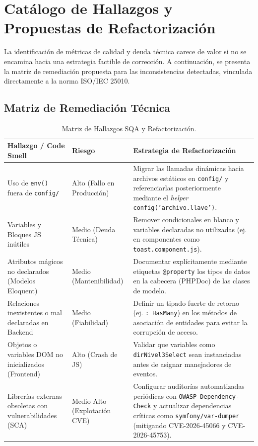 \section{Catálogo de Hallazgos y Propuestas de Refactorización}

La identificación de métricas de calidad y deuda técnica carece de valor si no se encamina hacia una estrategia factible de corrección. A continuación, se presenta la matriz de remediación propuesta para las inconsistencias detectadas, vinculada directamente a la norma ISO/IEC 25010.

\subsection{Matriz de Remediación Técnica}

\begin{table}[h!]
\centering
\small
\begin{tabular}{|p{4.5cm}|p{2cm}|p{8.2cm}|}
\hline
\textbf{Hallazgo / Code Smell} & \textbf{Riesgo} & \textbf{Estrategia de Refactorización} \\ \hline
Uso de \texttt{env()} fuera de \texttt{config/} & Alto (Fallo en Producción) & Migrar las llamadas dinámicas hacia archivos estáticos en \texttt{config/} y referenciarlas posteriormente mediante el \textit{helper} \texttt{config('archivo.llave')}. \\ \hline
Variables y Bloques JS inútiles & Medio (Deuda Técnica) & Remover condicionales en blanco y variables declaradas no utilizadas (ej. en componentes como \texttt{toast.component.js}). \\ \hline
Atributos mágicos no declarados (Modelos Eloquent) & Medio (Mantenibilidad) & Documentar explícitamente mediante etiquetas \texttt{@property} los tipos de datos en la cabecera (PHPDoc) de las clases de modelo. \\ \hline
Relaciones inexistentes o mal declaradas en Backend & Medio (Fiabilidad) & Definir un tipado fuerte de retorno (ej. \texttt{: HasMany}) en los métodos de asociación de entidades para evitar la corrupción de acceso. \\ \hline
Objetos o variables DOM no inicializados (Frontend) & Alto (Crash de JS) & Validar que variables como \texttt{dirNivel3Select} sean instanciadas antes de asignar manejadores de eventos. \\ \hline
Librerías externas obsoletas con vulnerabilidades (SCA) & Medio-Alto (Explotación CVE) & Configurar auditorías automatizadas periódicas con \texttt{OWASP Dependency-Check} y actualizar dependencias críticas como \texttt{symfony/var-dumper} (mitigando CVE-2026-45066 y CVE-2026-45753). \\ \hline
\end{tabular}
\caption{Matriz de Hallazgos SQA y Refactorización.}
\label{tab:matriz_hallazgos}
\end{table}

